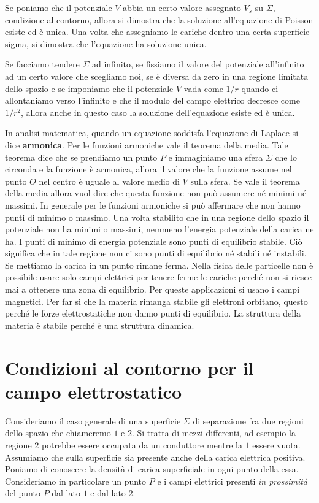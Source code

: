 Se poniamo che il potenziale $V$ abbia un certo valore assegnato $V_s $ su $\Sigma$, condizione al contorno, allora si dimostra che la soluzione all'equazione di Poisson esiste ed è unica. Una volta che assegniamo le cariche dentro una certa superficie sigma, si dimostra che l'equazione ha soluzione unica.

Se facciamo tendere $\Sigma$ ad infinito, se fissiamo il valore del potenziale all'infinito ad un certo valore che scegliamo noi, se è diversa da zero in una regione limitata dello spazio e se imponiamo che il potenziale $V$ vada come $1/r$ quando ci allontaniamo verso l'infinito e che il modulo del campo elettrico decresce come $1/r^2$, allora anche in questo caso la soluzione dell'equazione esiste ed è unica.

In analisi matematica, quando un equazione soddisfa l'equazione di Laplace si dice \textbf{armonica}. Per le funzioni armoniche vale il teorema della media. Tale teorema dice che se prendiamo un punto $P$ e immaginiamo una sfera $ \Sigma  $ che lo circonda e la funzione è armonica, allora il valore che la funzione assume nel punto $O$ nel centro è uguale al valore medio di $V$ sulla sfera.
Se vale il teorema della media allora vuol dire che questa funzione non può assumere né minimi né massimi. In generale per le funzioni armoniche si può affermare che non hanno punti di minimo o massimo. Una volta stabilito che in una regione dello spazio il potenziale non ha minimi o massimi, nemmeno l'energia potenziale della carica ne ha. I punti di minimo di energia potenziale sono punti di equilibrio stabile. Ciò significa che in tale regione non ci sono punti di equilibrio né stabili né instabili. Se mettiamo la carica in un punto rimane ferma. Nella fisica delle particelle non è possibile usare solo campi elettrici per tenere ferme le cariche perché non si riesce mai a ottenere una zona di equilibrio. Per queste applicazioni si usano i campi magnetici. Per far sì che la materia rimanga stabile gli elettroni orbitano, questo perché le forze elettrostatiche non danno punti di equilibrio. La struttura della materia è stabile perché è una struttura dinamica.

\section{Condizioni al contorno per il campo elettrostatico}

Consideriamo il caso generale di una superficie $\Sigma$ di separazione fra due regioni dello spazio che chiameremo $1$ e $2$. Si tratta di mezzi differenti, ad esempio la regione $2$ potrebbe essere occupata da un conduttore mentre la $1$ essere vuota. Assumiamo che sulla superficie sia presente anche della carica elettrica positiva. Poniamo di conoscere la densità di carica superficiale in ogni punto della essa. Consideriamo in particolare un punto $P$ e i campi elettrici presenti \emph{in prossimità} del punto $P$ dal lato $1$ e dal lato $2$.

